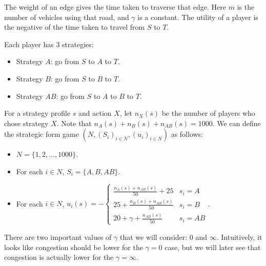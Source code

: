 \begin{center}
\end{center}

The weight of an edge gives the time taken to traverse that edge.
Here $m$ is the number of vehicles using that road, and $\gamma$ is a constant.
The utility of a player is the negative of the time taken to travel from $S$ to $T$.

Each player has 3 strategies:
\begin{itemize}
\item Strategy $A$: go from $S$ to $A$ to $T$.
\item Strategy $B$: go from $S$ to $B$ to $T$.
\item Strategy $AB$: go from $S$ to $A$ to $B$ to $T$.
\end{itemize}
For a strategy profile $s$ and action $X$,
let $n_X(s)$ be the number of players who chose strategy $X$.
Note that $n_A(s) + n_B(s) + n_{AB}(s) = 1000$.
We can define the strategic form game $(N, (S_i)_{i \in N}, (u_i)_{i \in N})$ as follows:

\begin{itemize}
\item $N = \{1, 2, \ldots, 1000\}$.
\item For each $i \in N$, $S_i = \{A, B, AB\}$.
\item For each $i \in N$, ${\displaystyle u_i(s) = -\begin{cases}
\displaystyle \frac{n_A(s) + n_{AB}(s)}{50} + 25 & s_i = A
\\[10pt] \displaystyle 25 + \frac{n_B(s) + n_{AB}(s)}{50} & s_i = B
\\[10pt] \displaystyle 20 + \gamma + \frac{n_{AB}(s)}{50} & s_i = AB
\end{cases}}$.
\end{itemize}

There are two important values of $\gamma$ that we will consider: $0$ and $\infty$.
Intuitively, it looks like congestion should be lower for the $\gamma = 0$ case,
but we will later see that congestion is actually lower for the $\gamma = \infty$.

